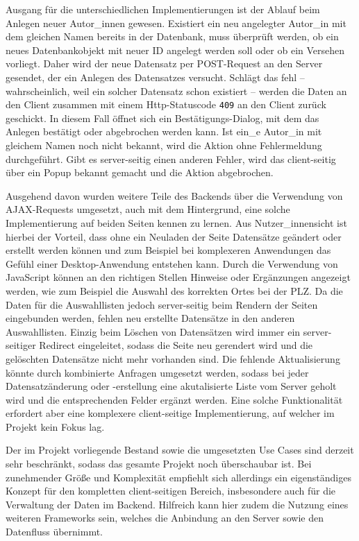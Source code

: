 		Ausgang für die unterschiedlichen Implementierungen ist der Ablauf beim Anlegen neuer Autor\_innen gewesen. Existiert ein neu angelegter Autor\_in mit dem gleichen Namen bereits in der Datenbank, muss überprüft werden, ob ein neues Datenbankobjekt mit neuer ID angelegt werden soll oder ob ein Versehen vorliegt. Daher wird der neue Datensatz per POST-Request an den Server gesendet, der ein Anlegen des Datensatzes versucht. Schlägt das fehl -- wahrscheinlich, weil ein solcher Datensatz schon existiert -- werden die Daten an den Client zusammen mit einem Http-Statuscode \lstinline|409| an den Client zurück geschickt. In diesem Fall öffnet sich ein Bestätigungs-Dialog, mit dem das Anlegen bestätigt oder abgebrochen werden kann. Ist ein\_e Autor\_in mit gleichem Namen noch nicht bekannt, wird die Aktion ohne Fehlermeldung durchgeführt. Gibt es server-seitig einen anderen Fehler, wird das client-seitig über ein Popup bekannt gemacht und die Aktion abgebrochen.
		
		Ausgehend davon wurden weitere Teile des Backends über die Verwendung von AJAX-Requests umgesetzt, auch mit dem Hintergrund, eine solche Implementierung auf beiden Seiten kennen zu lernen. Aus Nutzer\_innensicht ist hierbei der Vorteil, dass ohne ein Neuladen der Seite Datensätze geändert oder erstellt werden können und zum Beispiel bei komplexeren Anwendungen das Gefühl einer Desktop-Anwendung entstehen kann. Durch die Verwendung von JavaScript können an den richtigen Stellen Hinweise oder Ergänzungen angezeigt werden, wie zum Beispiel die Auswahl des korrekten Ortes bei der PLZ. Da die Daten für die Auswahllisten jedoch server-seitig beim Rendern der Seiten eingebunden werden, fehlen neu erstellte Datensätze in den anderen Auswahllisten. Einzig beim Löschen von Datensätzen wird immer ein server-seitiger Redirect eingeleitet, sodass die Seite neu gerendert wird und die gelöschten Datensätze nicht mehr vorhanden sind. Die fehlende Aktualisierung könnte durch kombinierte Anfragen umgesetzt werden, sodass bei jeder Datensatzänderung oder -erstellung eine akutalisierte Liste vom Server geholt wird und die entsprechenden Felder ergänzt werden. Eine solche Funktionalität erfordert aber eine komplexere client-seitige Implementierung, auf welcher im Projekt kein Fokus lag.
		
		Der im Projekt vorliegende Bestand sowie die umgesetzten Use Cases sind derzeit sehr beschränkt, sodass das gesamte Projekt noch überschaubar ist. Bei zunehmender Größe und Komplexität empfiehlt sich allerdings ein eigenständiges Konzept für den kompletten client-seitigen Bereich, insbesondere auch für die Verwaltung der Daten im Backend. Hilfreich kann hier zudem die Nutzung eines weiteren Frameworks sein, welches die Anbindung an den Server sowie den Datenfluss übernimmt.
		
